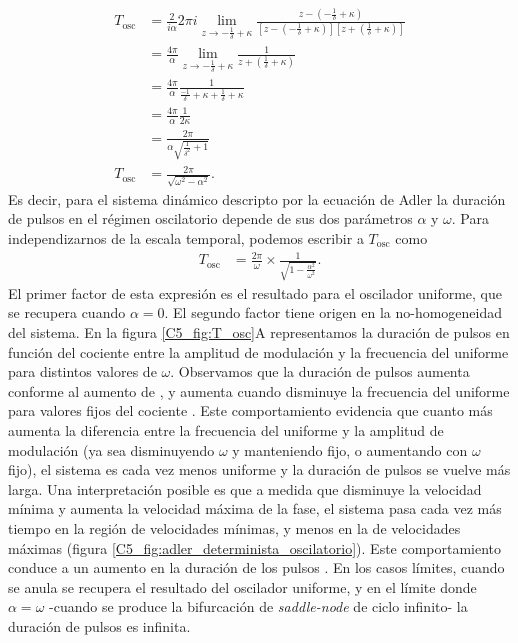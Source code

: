 \documentclass[./main.tex]{subfiles}
\begin{document}
\begin{align}
   T_{\text{osc}} &= \frac{2}{i\alpha} 2\pi i \lim_{z \to -\frac{1}{\delta} + \kappa} \frac{z-(-\frac{1}{\delta} + \kappa)}{[z-(-\frac{1}{\delta} + \kappa)][z + (\frac{1}{\delta} + \kappa)] } \nonumber\\
    &= \frac{4\pi}{\alpha} \lim_{z \to -\frac{1}{\delta} + \kappa} \frac{1}{z + (\frac{1}{\delta} + \kappa)} \nonumber \\
     &= \frac{4\pi}{\alpha}  \frac{1}{\frac{-1}{\delta} + \kappa + \frac{1}{\delta} + \kappa} \nonumber \\
     &=\frac{4\pi}{\alpha}  \frac{1}{2 \kappa} \nonumber\\
     &= \frac{2\pi}{\alpha \sqrt{\frac{1}{\delta^{2}} + 1}} \nonumber \\
       T_{\text{osc}} &= \frac{2\pi}{\sqrt{\omega^{2}-\alpha^{2}}}.
      \label{C5_eq:T_osc}
\end{align}
Es decir, para el sistema dinámico descripto por la ecuación de Adler la duración de pulsos en el régimen oscilatorio depende de sus dos parámetros $\alpha$ y $\omega$. Para independizarnos de la escala temporal, podemos escribir a $T_{\text{osc}}$ como
\begin{align}
    T_{\text{osc}} &= \frac{2\pi}{\omega} \times \frac{1}{\sqrt{1-\frac{\alpha^{2}}{\omega^{2}}}}.
\end{align}
El primer factor de esta expresión es el resultado para el oscilador uniforme, que se recupera cuando $\alpha = 0$. El segundo factor tiene origen en la no-homogeneidad del sistema. En la figura \ref{C5_fig:T_osc}A representamos la duración de pulsos en función del cociente entre la amplitud de modulación y la frecuencia del uniforme \dddelta para distintos valores de $\omega$. Observamos que la duración de pulsos aumenta conforme al aumento de \dddelta, y aumenta cuando disminuye la frecuencia del uniforme para valores fijos del cociente \dddelta. Este comportamiento evidencia que cuanto más aumenta la diferencia entre la frecuencia del uniforme y la amplitud de modulación (ya sea disminuyendo $\omega$ y manteniendo \dddelta fijo, o aumentando \dddelta con $\omega$ fijo), el sistema es cada vez menos uniforme y la duración de pulsos se vuelve más larga. Una interpretación posible es que a medida que disminuye la velocidad mínima y aumenta la velocidad máxima de la fase, el sistema pasa cada vez más tiempo en la región de velocidades mínimas, y menos en la de velocidades máximas (figura \ref{C5_fig:adler_determinista_oscilatorio}). Este comportamiento conduce a un aumento en la duración de los pulsos \cite{Strogatz1994}. En los casos límites, cuando \dddelta se anula se recupera el resultado del oscilador uniforme, y en el límite donde $\alpha = \omega$ -cuando se produce la bifurcación de \textit{saddle-node} de ciclo infinito- la duración de pulsos es infinita. %
\end{document}
